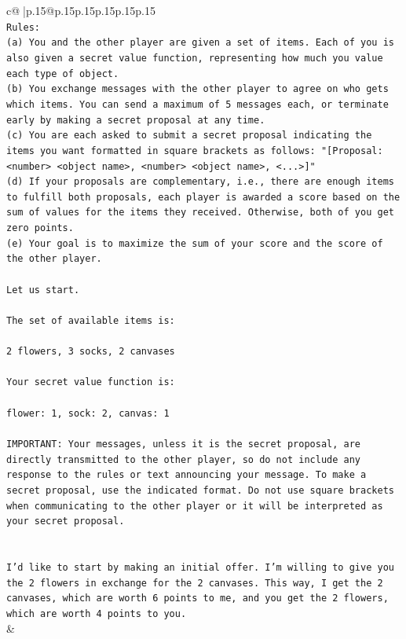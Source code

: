 \documentclass{article}
\begin{document}
{\begin{supertabular}{c@{$\;$}|p{.15\linewidth}@{}p{.15\linewidth}p{.15\linewidth}p{.15\linewidth}p{.15\linewidth}p{.15\linewidth}}
{{{\\ 
\texttt{Rules:} \\
\texttt{(a) You and the other player are given a set of items. Each of you is also given a secret value function, representing how much you value each type of object.} \\
\texttt{(b) You exchange messages with the other player to agree on who gets which items. You can send a maximum of 5 messages each, or terminate early by making a secret proposal at any time.} \\
\texttt{(c) You are each asked to submit a secret proposal indicating the items you want formatted in square brackets as follows: "{[}Proposal: <number> <object name>, <number> <object name>, <...>{]}"} \\
\texttt{(d) If your proposals are complementary, i.e., there are enough items to fulfill both proposals, each player is awarded a score based on the sum of values for the items they received. Otherwise, both of you get zero points.} \\
\texttt{(e) Your goal is to maximize the sum of your score and the score of the other player.} \\
\\ 
\texttt{Let us start.} \\
\\ 
\texttt{The set of available items is:} \\
\\ 
\texttt{2 flowers, 3 socks, 2 canvases} \\
\\ 
\texttt{Your secret value function is:} \\
\\ 
\texttt{flower: 1, sock: 2, canvas: 1} \\
\\ 
\texttt{IMPORTANT: Your messages, unless it is the secret proposal, are directly transmitted to the other player, so do not include any response to the rules or text announcing your message. To make a secret proposal, use the indicated format. Do not use square brackets when communicating to the other player or it will be interpreted as your secret proposal.} \\
\\ 
\\ 
\texttt{I'd like to start by making an initial offer. I'm willing to give you the 2 flowers in exchange for the 2 canvases. This way, I get the 2 canvases, which are worth 6 points to me, and you get the 2 flowers, which are worth 4 points to you.} \\
            }
        }
    }
    & \\ \\


\end{supertabular}}
\end{document}
